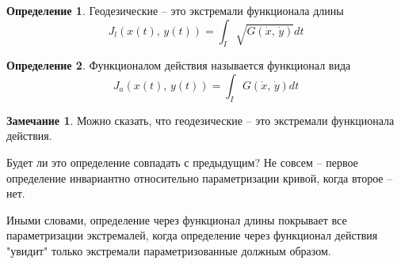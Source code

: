 \documentclass[a4paper,12pt]{article}
\theoremstyle{plain}
\theoremstyle{definition}
\newtheorem{definition}{Определение}[section]
\newtheorem*{note}{Замечание}
\theoremstyle{remark}
\begin{document}
\begin{definition}
	Геодезические -- это экстремали функционала длины
	\[J_l(x(t),\,y(t)) = \int_I\sqrt{G(\dot{x},\,\dot{y})}dt\]
\end{definition}

\begin{definition}
	Функционалом действия называется функционал вида
	\[J_a(x(t),\,y(t)) = \int_I G(\dot{x},\,\dot{y})dt\]
\end{definition}

\begin{note}
	Можно сказать, что геодезические -- это экстремали функционала действия. 
	
	Будет ли это определение совпадать с предыдущим? Не совсем -- первое определение инвариантно относительно параметризации кривой, когда второе -- нет.

	Иными словами, определение через функционал длины покрывает все параметризации экстремалей, когда определение через функционал действия "увидит" только экстремали параметризованные должным образом.
\end{note}
\end{document}
